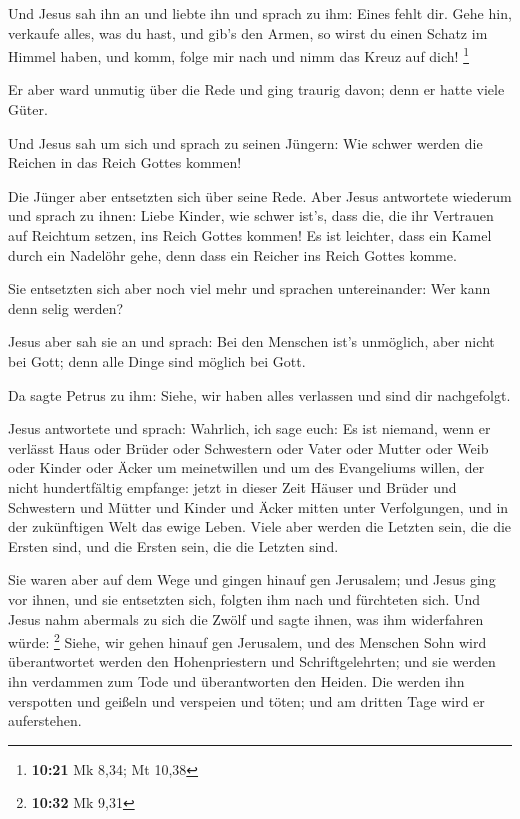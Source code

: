  Und Jesus sah ihn an und liebte ihn und sprach zu ihm:
Eines fehlt dir. Gehe hin, verkaufe alles, was du hast, und gib's den
Armen, so wirst du einen Schatz im Himmel haben, und komm, folge mir
nach und nimm das Kreuz auf dich! \footnote{\textbf{10:21} Mk 8,34; Mt
  10,38}

 Er aber ward unmutig über die Rede und ging traurig
davon; denn er hatte viele Güter.

 Und Jesus sah um sich und sprach zu seinen Jüngern: Wie
schwer werden die Reichen in das Reich Gottes kommen!

 Die Jünger aber entsetzten sich über seine Rede. Aber
Jesus antwortete wiederum und sprach zu ihnen: Liebe Kinder, wie schwer
ist's, dass die, die ihr Vertrauen auf Reichtum setzen, ins Reich Gottes
kommen!  Es ist leichter, dass ein Kamel durch ein
Nadelöhr gehe, denn dass ein Reicher ins Reich Gottes komme.

 Sie entsetzten sich aber noch viel mehr und sprachen
untereinander: Wer kann denn selig werden?

 Jesus aber sah sie an und sprach: Bei den Menschen ist's
unmöglich, aber nicht bei Gott; denn alle Dinge sind möglich bei Gott.

 Da sagte Petrus zu ihm: Siehe, wir haben alles verlassen
und sind dir nachgefolgt.

 Jesus antwortete und sprach: Wahrlich, ich sage euch: Es
ist niemand, wenn er verlässt Haus oder Brüder oder Schwestern oder
Vater oder Mutter oder Weib oder Kinder oder Äcker um meinetwillen und
um des Evangeliums willen,  der nicht hundertfältig
empfange: jetzt in dieser Zeit Häuser und Brüder und Schwestern und
Mütter und Kinder und Äcker mitten unter Verfolgungen, und in der
zukünftigen Welt das ewige Leben.  Viele aber werden die
Letzten sein, die die Ersten sind, und die Ersten sein, die die Letzten
sind.

 Sie waren aber auf dem Wege und gingen hinauf gen
Jerusalem; und Jesus ging vor ihnen, und sie entsetzten sich, folgten
ihm nach und fürchteten sich. Und Jesus nahm abermals zu sich die Zwölf
und sagte ihnen, was ihm widerfahren würde: \footnote{\textbf{10:32} Mk
  9,31}  Siehe, wir gehen hinauf gen Jerusalem, und des
Menschen Sohn wird überantwortet werden den Hohenpriestern und
Schriftgelehrten; und sie werden ihn verdammen zum Tode und
überantworten den Heiden.  Die werden ihn verspotten und
geißeln und verspeien und töten; und am dritten Tage wird er
auferstehen.

